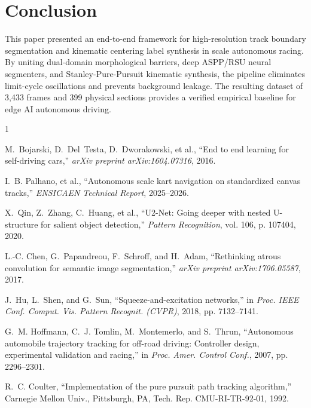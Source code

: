 \documentclass[10pt,journal,compsoc]{IEEEtran}
\begin{document}
\section{Conclusion}
This paper presented an end-to-end framework for high-resolution track boundary segmentation and kinematic centering label synthesis in scale autonomous racing. By uniting dual-domain morphological barriers, deep ASPP/RSU neural segmenters, and Stanley-Pure-Pursuit kinematic synthesis, the pipeline eliminates limit-cycle oscillations and prevents background leakage. The resulting dataset of 3,433 frames and 399 physical sections provides a verified empirical baseline for edge AI autonomous driving.


\begin{thebibliography}{1}

M.~Bojarski, D.~Del~Testa, D.~Dworakowski, et al., ``End to end learning for self-driving cars,'' \emph{arXiv preprint arXiv:1604.07316}, 2016.

I.~B. Palhano, et al., ``Autonomous scale kart navigation on standardized canvas tracks,'' \emph{ENSICAEN Technical Report}, 2025--2026.

X.~Qin, Z.~Zhang, C.~Huang, et al., ``U2-Net: Going deeper with nested U-structure for salient object detection,'' \emph{Pattern Recognition}, vol. 106, p. 107404, 2020.

L.-C. Chen, G.~Papandreou, F.~Schroff, and H.~Adam, ``Rethinking atrous convolution for semantic image segmentation,'' \emph{arXiv preprint arXiv:1706.05587}, 2017.

J.~Hu, L.~Shen, and G.~Sun, ``Squeeze-and-excitation networks,'' in \emph{Proc. IEEE Conf. Comput. Vis. Pattern Recognit. (CVPR)}, 2018, pp. 7132--7141.

G.~M. Hoffmann, C.~J. Tomlin, M.~Montemerlo, and S.~Thrun, ``Autonomous automobile trajectory tracking for off-road driving: Controller design, experimental validation and racing,'' in \emph{Proc. Amer. Control Conf.}, 2007, pp. 2296--2301.

R.~C. Coulter, ``Implementation of the pure pursuit path tracking algorithm,'' Carnegie Mellon Univ., Pittsburgh, PA, Tech. Rep. CMU-RI-TR-92-01, 1992.

\end{thebibliography}
\end{document}
